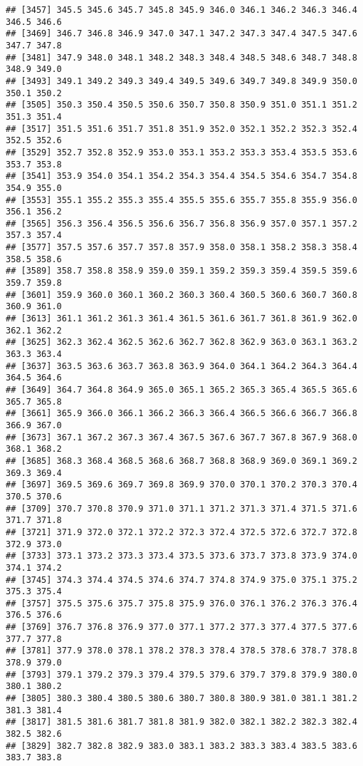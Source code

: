 \documentclass[
]{article}
\begin{document}
\begin{verbatim}
## [3457] 345.5 345.6 345.7 345.8 345.9 346.0 346.1 346.2 346.3 346.4 346.5 346.6
## [3469] 346.7 346.8 346.9 347.0 347.1 347.2 347.3 347.4 347.5 347.6 347.7 347.8
## [3481] 347.9 348.0 348.1 348.2 348.3 348.4 348.5 348.6 348.7 348.8 348.9 349.0
## [3493] 349.1 349.2 349.3 349.4 349.5 349.6 349.7 349.8 349.9 350.0 350.1 350.2
## [3505] 350.3 350.4 350.5 350.6 350.7 350.8 350.9 351.0 351.1 351.2 351.3 351.4
## [3517] 351.5 351.6 351.7 351.8 351.9 352.0 352.1 352.2 352.3 352.4 352.5 352.6
## [3529] 352.7 352.8 352.9 353.0 353.1 353.2 353.3 353.4 353.5 353.6 353.7 353.8
## [3541] 353.9 354.0 354.1 354.2 354.3 354.4 354.5 354.6 354.7 354.8 354.9 355.0
## [3553] 355.1 355.2 355.3 355.4 355.5 355.6 355.7 355.8 355.9 356.0 356.1 356.2
## [3565] 356.3 356.4 356.5 356.6 356.7 356.8 356.9 357.0 357.1 357.2 357.3 357.4
## [3577] 357.5 357.6 357.7 357.8 357.9 358.0 358.1 358.2 358.3 358.4 358.5 358.6
## [3589] 358.7 358.8 358.9 359.0 359.1 359.2 359.3 359.4 359.5 359.6 359.7 359.8
## [3601] 359.9 360.0 360.1 360.2 360.3 360.4 360.5 360.6 360.7 360.8 360.9 361.0
## [3613] 361.1 361.2 361.3 361.4 361.5 361.6 361.7 361.8 361.9 362.0 362.1 362.2
## [3625] 362.3 362.4 362.5 362.6 362.7 362.8 362.9 363.0 363.1 363.2 363.3 363.4
## [3637] 363.5 363.6 363.7 363.8 363.9 364.0 364.1 364.2 364.3 364.4 364.5 364.6
## [3649] 364.7 364.8 364.9 365.0 365.1 365.2 365.3 365.4 365.5 365.6 365.7 365.8
## [3661] 365.9 366.0 366.1 366.2 366.3 366.4 366.5 366.6 366.7 366.8 366.9 367.0
## [3673] 367.1 367.2 367.3 367.4 367.5 367.6 367.7 367.8 367.9 368.0 368.1 368.2
## [3685] 368.3 368.4 368.5 368.6 368.7 368.8 368.9 369.0 369.1 369.2 369.3 369.4
## [3697] 369.5 369.6 369.7 369.8 369.9 370.0 370.1 370.2 370.3 370.4 370.5 370.6
## [3709] 370.7 370.8 370.9 371.0 371.1 371.2 371.3 371.4 371.5 371.6 371.7 371.8
## [3721] 371.9 372.0 372.1 372.2 372.3 372.4 372.5 372.6 372.7 372.8 372.9 373.0
## [3733] 373.1 373.2 373.3 373.4 373.5 373.6 373.7 373.8 373.9 374.0 374.1 374.2
## [3745] 374.3 374.4 374.5 374.6 374.7 374.8 374.9 375.0 375.1 375.2 375.3 375.4
## [3757] 375.5 375.6 375.7 375.8 375.9 376.0 376.1 376.2 376.3 376.4 376.5 376.6
## [3769] 376.7 376.8 376.9 377.0 377.1 377.2 377.3 377.4 377.5 377.6 377.7 377.8
## [3781] 377.9 378.0 378.1 378.2 378.3 378.4 378.5 378.6 378.7 378.8 378.9 379.0
## [3793] 379.1 379.2 379.3 379.4 379.5 379.6 379.7 379.8 379.9 380.0 380.1 380.2
## [3805] 380.3 380.4 380.5 380.6 380.7 380.8 380.9 381.0 381.1 381.2 381.3 381.4
## [3817] 381.5 381.6 381.7 381.8 381.9 382.0 382.1 382.2 382.3 382.4 382.5 382.6
## [3829] 382.7 382.8 382.9 383.0 383.1 383.2 383.3 383.4 383.5 383.6 383.7 383.8

\end{verbatim}
\end{document}
